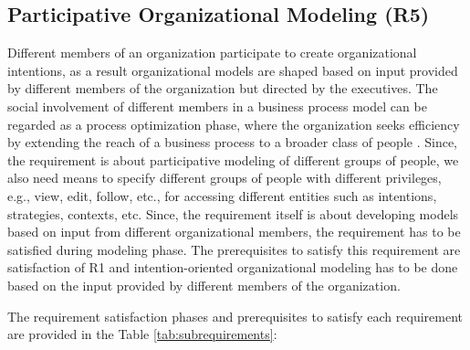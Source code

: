 \subsection{Participative Organizational Modeling (R5)}
 Different members of an organization participate to create organizational intentions, as a result organizational models are shaped based on input provided by different members of the organization but directed by the executives. The social involvement of different members in a business process model can be regarded as a process optimization phase, where the organization seeks efficiency by extending the reach of a business process to a broader class of people \cite{Brambilla2012}. Since, the requirement is about participative modeling of different groups of people, we also need means to specify different groups of people with different privileges, e.g., view, edit, follow, etc., for accessing different entities such as intentions, strategies, contexts, etc. Since, the requirement itself is about developing models based on input from different organizational members, the requirement has to be satisfied during modeling phase. The prerequisites to satisfy this requirement are satisfaction of R1 and intention-oriented organizational modeling has to be done based on the input provided by different members of the organization.  
 
 The requirement satisfaction phases and prerequisites to satisfy each requirement are provided in the Table \ref{tab:subrequirements}:

